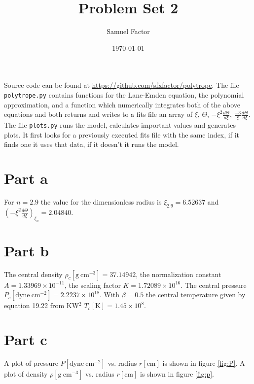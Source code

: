 \documentclass[12pt]{article}
\title{\vspace{-1in}Problem Set 2}
\author{Samuel Factor}
\date{\today}                                           %
\begin{document}
\maketitle

Source code can be found at \url{https://github.com/sfxfactor/polytrope}. The file \texttt{polytrope.py} contains functions for the Lane-Emden equation, the polynomial approximation, and a function which numerically integrates both of the above equations and both returns and writes to a fits file an array of $\xi$, $\Theta$, $-\xi^2 \frac{d\Theta}{d\xi}$, $\frac{-3}{\xi}\frac{d\Theta}{d\xi}$. The file \texttt{plots.py} runs the model, calculates important values and generates plots. It first looks for a previously executed fits file with the same index, if it finds one it uses that data, if it doesn't it runs the model. 

\section{Part a}
For $n=2.9$ the value for the dimensionless radius is $\xi_{2.9}=6.52637$ and $(-\xi^2\frac{d\Theta}{d\xi})_{\xi_n}=2.04840$.

\section{Part b}
The central density $\rho_c [\mathrm{g~cm^{-3}}] =37.14942$, the normalization constant $A=1.33969\times10^{-11}$, the scaling factor $K=1.72089\times10^{16}$. The central pressure $P_c [\mathrm{dyne~cm^{-2}}] = 2.2237\times10^{18}$. With $\beta=0.5$ the central temperature given by equation 19.22 from KW$^2$ $T_c[\mathrm{K}]=1.45\times10^8$.

\section{Part c}
A plot of pressure $P [\mathrm{dyne~cm^{-2}}]$ vs. radius $r [\mathrm{cm}]$ is shown in figure \ref{fig:P}. A plot of density $\rho [\mathrm{g~cm^{-3}}]$ vs. radius $r [\mathrm{cm}]$ is shown in figure \ref{fig:p}.
\end{document}
